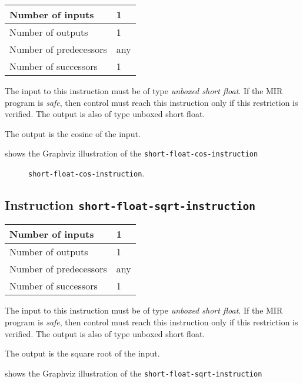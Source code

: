 \begin{tabular}{|l|l|}
\hline
Number of inputs & 1\\
\hline
Number of outputs & 1\\
\hline
Number of predecessors & any\\
\hline
Number of successors & 1\\
\hline
\end{tabular}

The input to this instruction must be of type \emph{unboxed short
  float}.  If the MIR program is \emph{safe}, then control must reach
this instruction only if this restriction is verified.  The output is
also of type unboxed short float.

The output is the cosine of the input.

 shows the Graphviz illustration of the
\texttt{short-float-cos-instruction}

\begin{figure}
\begin{center}
\end{center}
\caption{\label{fig-short-float-cos-instruction}
\texttt{short-float-cos-instruction}.}
\end{figure}

\subsection{Instruction \texttt{short-float-sqrt-instruction}}
\label{mir-instruction-short-float-div}

\begin{tabular}{|l|l|}
\hline
Number of inputs & 1\\
\hline
Number of outputs & 1\\
\hline
Number of predecessors & any\\
\hline
Number of successors & 1\\
\hline
\end{tabular}

The input to this instruction must be of type \emph{unboxed short
  float}.  If the MIR program is \emph{safe}, then control must reach
this instruction only if this restriction is verified.  The output is
also of type unboxed short float.

The output is the square root of the input.

 shows the Graphviz illustration of the
\texttt{short-float-sqrt-instruction}

